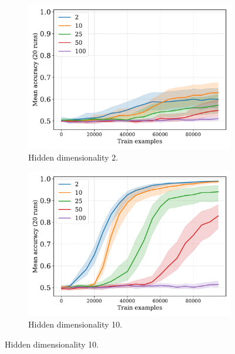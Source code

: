 \begin{figure}[H]
  \centering

  \begin{subfigure}{0.45\linewidth}
    \includegraphics[width=1\textwidth]{../fig/flatpremack-h2-train_size-embed_dim-hidden_dim=2.pdf}
    \caption{Hidden dimensionality 2.}
  \end{subfigure}
  \hfill
  \begin{subfigure}{0.45\linewidth}
    \includegraphics[width=1\textwidth]{../fig/flatpremack-h2-train_size-embed_dim-hidden_dim=10.pdf}
    \caption{Hidden dimensionality 10.}
  \end{subfigure}

  \vspace{24pt}


\end{figure}
